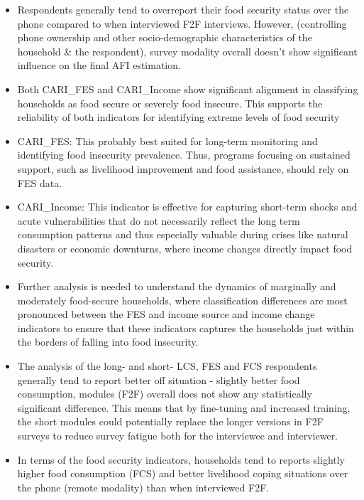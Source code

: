 \documentclass[11pt,harvard]{article}
\begin{document}
	\begin{itemize}[left=2.5em]
		\item Respondents generally tend to overreport their food security status over the phone compared to when interviewed F2F interviews. However, (controlling phone ownership and other socio-demographic characteristics of the household \& the respondent), survey modality overall doesn’t show significant influence on the final AFI estimation.
		\item Both CARI\_FES and CARI\_Income show significant alignment in classifying households as food secure or severely food insecure. This supports the reliability of both indicators for identifying extreme levels of food security
		\item CARI\_FES: This probably best suited for long-term monitoring and identifying food insecurity prevalence. Thus, programs focusing on sustained support, such as livelihood improvement and food assistance, should rely on FES data.
		\item CARI\_Income: This indicator is effective for capturing short-term shocks and acute vulnerabilities that do not necessarily reflect the long term consumption patterns and thus especially valuable during crises like natural disasters or economic downturns, where income changes directly impact food security.
		\item Further analysis is needed to understand the dynamics of marginally and moderately food-secure households, where classification differences are most pronounced between the FES and income source and income change indicators to ensure that these indicators captures the households just within the borders of falling into food insecurity.
		\item The analysis of the long- and short- LCS, FES and FCS respondents generally tend to report better off situation - slightly better food consumption, modules (F2F) overall does not show any statistically significant difference. This means that by fine-tuning and increased training, the short modules could potentially replace the longer versions in F2F surveys to reduce survey fatigue both for the interviewee and interviewer.
		\item In terms of the food security indicators, households tend to reports slightly higher food consumption (FCS) and better livelihood coping situations over the phone (remote modality) than when interviewed F2F. 
	\end{itemize}
	
\end{document}
